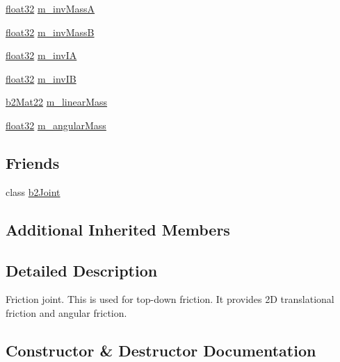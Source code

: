 \begin{DoxyCompactItemize}
\item 
\mbox{\hyperlink{b2_settings_8h_aacdc525d6f7bddb3ae95d5c311bd06a1}{float32}} \mbox{\hyperlink{classb2_friction_joint_a7b7a482216efd081db94465db409fa21}{m\+\_\+inv\+MassA}}
\item 
\mbox{\hyperlink{b2_settings_8h_aacdc525d6f7bddb3ae95d5c311bd06a1}{float32}} \mbox{\hyperlink{classb2_friction_joint_a189a3869e59f6b1e00c83fcaf6b08253}{m\+\_\+inv\+MassB}}
\item 
\mbox{\hyperlink{b2_settings_8h_aacdc525d6f7bddb3ae95d5c311bd06a1}{float32}} \mbox{\hyperlink{classb2_friction_joint_aad004207b7392e9828f55d8f15dc2aa8}{m\+\_\+inv\+IA}}
\item 
\mbox{\hyperlink{b2_settings_8h_aacdc525d6f7bddb3ae95d5c311bd06a1}{float32}} \mbox{\hyperlink{classb2_friction_joint_a79ab8b49c2d4ce6415e3fe9376947d4c}{m\+\_\+inv\+IB}}
\item 
\mbox{\hyperlink{structb2_mat22}{b2\+Mat22}} \mbox{\hyperlink{classb2_friction_joint_aa49bf4b20865a4976c3fae8398191182}{m\+\_\+linear\+Mass}}
\item 
\mbox{\hyperlink{b2_settings_8h_aacdc525d6f7bddb3ae95d5c311bd06a1}{float32}} \mbox{\hyperlink{classb2_friction_joint_ab8f9aa5e516d90f1c80f92b0eb410c38}{m\+\_\+angular\+Mass}}
\end{DoxyCompactItemize}
\subsection*{Friends}
\begin{DoxyCompactItemize}
\item 
class \mbox{\hyperlink{classb2_friction_joint_a54ade8ed3d794298108d7f4c4e4793fa}{b2\+Joint}}
\end{DoxyCompactItemize}
\subsection*{Additional Inherited Members}


\subsection{Detailed Description}
Friction joint. This is used for top-\/down friction. It provides 2D translational friction and angular friction. 

\subsection{Constructor \& Destructor Documentation}
\mbox{\label{classb2_friction_joint_a7413c5f289257f0e993b7e750fe95b99}} 
